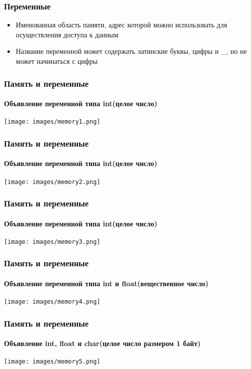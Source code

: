 \documentclass[12pt,pdf,hyperref={unicode}]{beamer}
\begin{document}
\begin{frame}
\frametitle{Переменные} 
\begin{center}
\begin{itemize}
\item Именованная область памяти, адрес которой можно использовать для осуществления доступа к данным
\item Название переменной может содержать латинские буквы, цифры и \_, но не может начинаться с цифры
\end{itemize}
\end{center}
\end{frame}


\begin{frame}[fragile]
\frametitle{Память и переменные} 
\framesubtitle{Объявление переменной типа int(целое число)} 
\begin{center}
\texttt{[image: images/memory1.png]}
\end{center}
\end{frame}

\begin{frame}[fragile]
\frametitle{Память и переменные} 
\framesubtitle{Объявление переменной типа int(целое число)} 
\begin{center}
\texttt{[image: images/memory2.png]}
\end{center}
\end{frame}

\begin{frame}[fragile]
\frametitle{Память и переменные} 
\framesubtitle{Объявление переменной типа int(целое число)} 
\begin{center}
\texttt{[image: images/memory3.png]}
\end{center}
\end{frame}

\begin{frame}[fragile]
\frametitle{Память и переменные} 
\framesubtitle{Объявление переменной типа int и float(вещественное число)} 
\begin{center}
\texttt{[image: images/memory4.png]}
\end{center}
\end{frame}

\begin{frame}[fragile]
\frametitle{Память и переменные} 
\framesubtitle{Объявление  int, float и char(целое число размером 1 байт)} 
\begin{center}
\texttt{[image: images/memory5.png]}
\end{center}
\end{frame}
\end{document}
